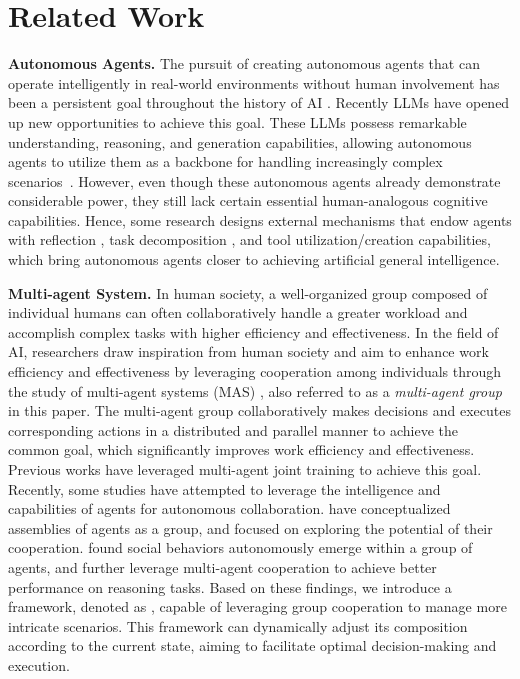 \section{Related Work}
\label{sec:related-work}

\textbf{Autonomous Agents.}
The pursuit of creating autonomous agents that can operate intelligently in real-world environments without human involvement has been a persistent goal throughout the history of AI \citep{wooldridge1995intelligent,Minsky88,bubeck2023sparks}. Recently LLMs \citep{touvron2023llama,DBLP:journals/corr/abs-2303-08774} have opened up new opportunities to achieve this goal. These LLMs possess remarkable understanding, reasoning, and generation capabilities, allowing autonomous agents to utilize them as a backbone for handling increasingly complex scenarios~\citep{richards2023auto,nakajima2023babyagi,agentgpt,liu2023agentbench}. However, even though these autonomous agents already demonstrate considerable power, they still lack certain essential human-analogous cognitive capabilities. Hence, some research designs external mechanisms that endow agents with reflection \citep{yao2023react,shinn2023reflexion}, task decomposition \citep{wei2023chainofthought,yao2023tree}, and tool utilization/creation \citep{schick2023toolformer,qin2023tool,qin2023toolllm,qian2023creator} capabilities, which bring autonomous agents closer to achieving artificial general intelligence.



\textbf{Multi-agent System.}
In human society, a well-organized group composed of individual humans can often collaboratively handle a greater workload and accomplish complex tasks with higher efficiency and effectiveness. In the field of AI, researchers draw inspiration from human society and aim to enhance work efficiency and effectiveness by leveraging cooperation among individuals through the study of multi-agent systems (MAS) \citep{multiagent_system}, also referred to as a \textit{multi-agent group} in this paper. The multi-agent group collaboratively makes decisions and executes corresponding actions in a distributed and parallel manner to achieve the common goal, which significantly improves work efficiency and effectiveness. Previous works have leveraged multi-agent joint training to achieve this goal. Recently, some studies have attempted to leverage the intelligence and capabilities of agents for autonomous collaboration. \cite{DBLP:journals/corr/abs-2303-17760} have conceptualized assemblies of agents as a group, and focused on exploring the potential of their cooperation. \cite{DBLP:journals/corr/abs-2304-03442} found social behaviors autonomously emerge within a group of agents, and \cite{DuMultiagentDebate,wang2023unleashing,zhang2023building,DBLP:journals/corr/abs-2307-07924,chan2023chateval} further leverage multi-agent cooperation to achieve better performance on reasoning tasks. Based on these findings, we introduce a framework, denoted as \textit{\framework}, capable of leveraging group cooperation to manage more intricate scenarios. This framework can dynamically adjust its composition according to the current state, aiming to facilitate optimal decision-making and execution.




